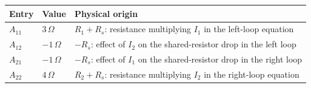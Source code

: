 \documentclass[border=12pt]{standalone}
\begin{document}
\color{weeknavy}
\renewcommand{\arraystretch}{1.45}
\begin{tabular}{>{\centering\arraybackslash}m{1.5cm}>{\centering\arraybackslash}m{1.5cm}>{\raggedright\arraybackslash}m{8.0cm}}
\toprule
\textbf{Entry} & \textbf{Value} & \textbf{Physical origin}\\
\midrule
$A_{11}$ & $3\,\Omega$ & $R_1+R_s$: resistance multiplying $I_1$ in the left-loop equation\\
$A_{12}$ & $-1\,\Omega$ & $-R_s$: effect of $I_2$ on the shared-resistor drop in the left loop\\
$A_{21}$ & $-1\,\Omega$ & $-R_s$: effect of $I_1$ on the shared-resistor drop in the right loop\\
$A_{22}$ & $4\,\Omega$ & $R_2+R_s$: resistance multiplying $I_2$ in the right-loop equation\\
\bottomrule
\end{tabular}
\end{document}
